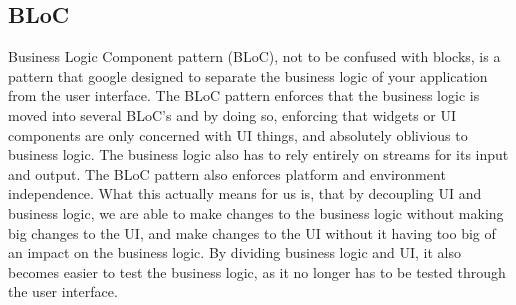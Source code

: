 \subsection{BLoC}
Business Logic Component pattern (BLoC), not to be confused with blocks, is a pattern that google designed to separate the business logic of your application from the user interface.
The BLoC pattern enforces that the business logic is moved into several BLoC's and by doing so, enforcing that widgets or UI components are only concerned with UI things, and absolutely oblivious to business logic. 
The business logic also has to rely entirely on streams for its input and output.
The BLoC pattern also enforces platform and environment independence. 
What this actually means for us is, that by decoupling UI and business logic, we are able to make changes to the business logic without making big changes to the UI, and make changes to the UI without it having too big of an impact on the business logic. 
By dividing business logic and UI, it also becomes easier to test the business logic, as it no longer has to be tested through the user interface. 
